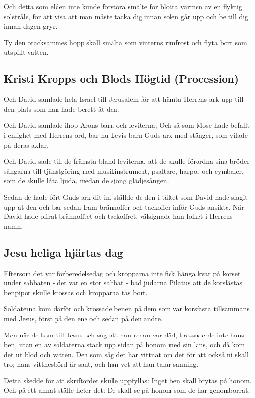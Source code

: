  Och detta som elden inte kunde förstöra
smälte för blotta värmen av en flyktig solstråle, för att visa att man måste
tacka dig innan solen går upp och be till dig innan dagen gryr.

 Ty den otacksammes hopp skall smälta som vinterns rimfrost och flyta bort som utspillt vatten.


\subsection{Kristi Kropps och Blods Högtid (Procession)}
{Och David samlade hela Israel till Jerusalem} för att hämta Herrens ark upp till den plats som han hade berett åt den. 

Och David samlade ihop Arons barn och leviterna; 
Och så som Mose hade befallt i enlighet med Herrens ord, bar nu Levis barn Guds ark med stänger, som vilade på deras axlar.

Och David sade till de främsta bland leviterna, att de skulle förordna sina bröder sångarna till tjänstgöring med musikinstrument, psaltare, harpor och cymbaler, som de skulle låta ljuda, medan de sjöng glädjesången. 

Sedan de hade fört Guds ark dit in, ställde de den i tältet som David hade slagit upp åt den och bar sedan fram brännoffer och tackoffer inför Guds ansikte. 
När David hade offrat brännoffret och tackoffret, välsignade han folket i Herrens namn.


\subsection{Jesu heliga hjärtas dag}
{Eftersom det var förberedelsedag} och kropparna inte fick hänga kvar på korset under sabbaten - det var en stor sabbat - bad judarna Pilatus att de korsfästas benpipor skulle krossas och kropparna tas bort. 

Soldaterna kom därför och krossade benen på dem som var korsfästa tillsammans med Jesus, först på den ene och sedan på den andre. 

Men när de kom till Jesus och såg att han redan var död, krossade de inte hans ben, utan en av soldaterna stack upp sidan på honom med sin lans, och då kom det ut blod och vatten. 
Den som såg det har vittnat om det för att också ni skall tro; hans vittnesbörd är sant, och han vet att han talar sanning. 

Detta skedde för att skriftordet skulle uppfyllas: Inget ben skall brytas på honom. 
Och på ett annat ställe heter det: De skall se på honom som de har genomborrat.

